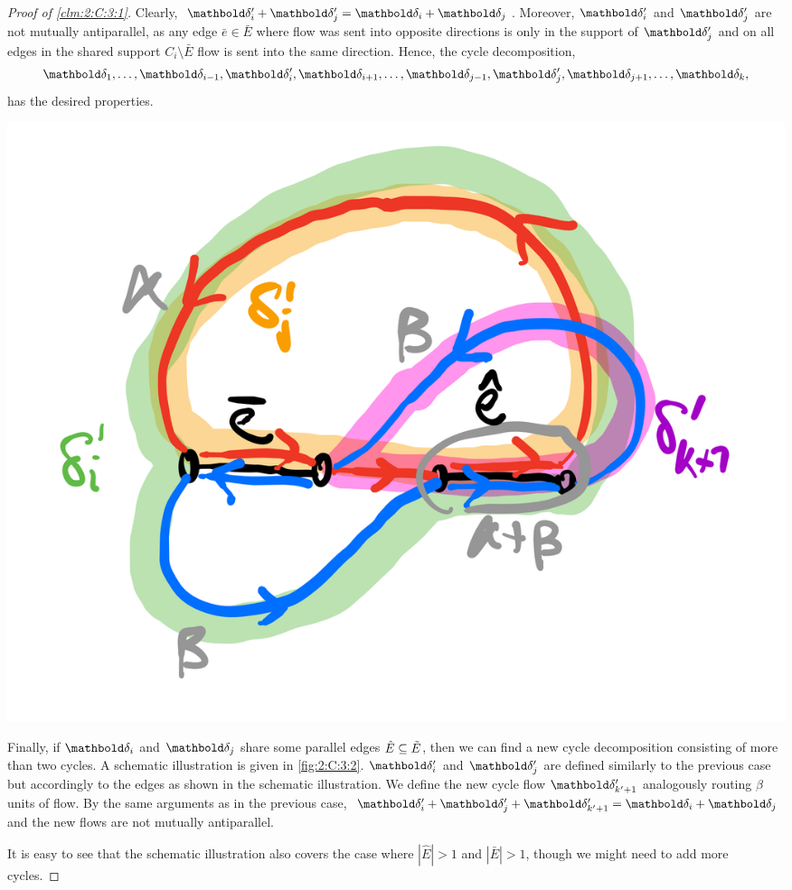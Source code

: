 \documentclass[nobib]{tufte-handout}
\newcommand{\Etil}{\Tilde{E}}
\begin{document}
\begin{proof}[Proof of \cref{clm:2:C:3:1}]
Clearly, $\vdelta_i' + \vdelta_j' = \vdelta_i + \vdelta_j$. Moreover, $\vdelta_i'$ and $\vdelta_j'$ are not mutually antiparallel, as any edge $\bar{e} \in \bar{E}$ where flow was sent into opposite directions is only in the support of $\vdelta_j'$ and on all edges in the shared support $C_i \setminus \bar{E}$ flow is sent into the same direction. Hence, the cycle decomposition, \begin{align*}
    \vdelta_1, \dots, \vdelta_{i-1}, \vdelta_i', \vdelta_{i+1}, \dots, \vdelta_{j-1}, \vdelta_j', \vdelta_{j+1}, \dots, \vdelta_k,
\end{align*} has the desired properties.

\begin{marginfigure}[-3\baselineskip]
\includegraphics[width=\textwidth]{assignments/figures/cycle_decomposition2.png}
\caption{Schematic illustration of the cycle flow update when parallel edges are present. $\vdelta_i$ sends $\alpha$ units of flow and $\vdelta_j$ sends $\beta$ units of flow. The net flow on the edge $\bar{e}$ is $\alpha - \beta$ and the net flow on the edge $\hat{e}$ is $\alpha + \beta$.}\label{fig:2:C:3:2}
\end{marginfigure}

Finally, if $\vdelta_i$ and $\vdelta_j$ share some parallel edges $\hat{E} \subseteq \Etil$, then we can find a new cycle decomposition consisting of more than two cycles. A schematic illustration is given in \cref{fig:2:C:3:2}. $\vdelta_i'$ and $\vdelta_j'$ are defined similarly to the previous case but accordingly to the edges as shown in the schematic illustration. We define the new cycle flow $\vdelta_{k'+1}'$ analogously routing $\beta$ units of flow. By the same arguments as in the previous case, $\vdelta_i' + \vdelta_j' + \vdelta_{k'+1}' = \vdelta_i + \vdelta_j$ and the new flows are not mutually antiparallel.

It is easy to see that the schematic illustration also covers the case where $|\hat{E}| > 1$ and $|\bar{E}| > 1$, though we might need to add more cycles.
\end{proof}
\end{document}
